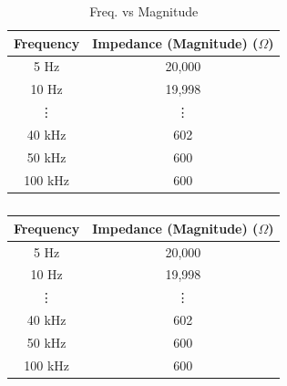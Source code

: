 \documentclass[12pt]{article}
\begin{document}
	\begin{table}[H]
		\centering
		\caption{Freq. vs Magnitude \\ }
		\begin{tabular}{cc}
			\toprule
			\multicolumn{1}{l}{\textbf{Frequency}} & \multicolumn{1}{l}{\textbf{Impedance (Magnitude) ($\Omega$)}} \\
			\midrule
			5 Hz  & 20,000 \\
			10 Hz & 19,998 \\
			\vdots     & \vdots \\
			40 kHz & 602 \\
			50 kHz & 600 \\
			100 kHz & 600 \\
			\bottomrule
		\end{tabular}
		\label{table:freqmag}%
	\end{table}%
	
	\captionsetup[table]{labelsep=newline, font=normalfont}	%
	\begin{table}[H]
		\centering
		\caption{\jadual}	%
		\begin{tabular}{cc}
			\toprule
			\multicolumn{1}{l}{\textbf{Frequency}} & \multicolumn{1}{l}{\textbf{Impedance (Magnitude) ($\Omega$)}} \\
			\midrule
			5 Hz  & 20,000 \\
			10 Hz & 19,998 \\
			\vdots     & \vdots \\
			40 kHz & 602 \\
			50 kHz & 600 \\
			100 kHz & 600 \\
			\bottomrule
		\end{tabular}
		\label{table:freqmag2}%
	\end{table}%
	
\end{document}
